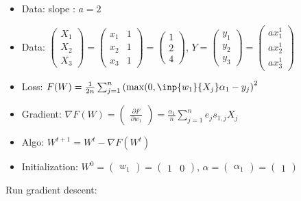 \begin{itemize}
	\item Data: slope : $a = 2$
	\item Data: $\begin{pmatrix} X_1\\X_2\\X_3\end{pmatrix} = \begin{pmatrix}x_1 & 1 \\ x_2 & 1\\x_3 & 1 \end{pmatrix}=\begin{pmatrix} 1 \\ 2 \\ 4 \end{pmatrix}  $, $Y = \begin{pmatrix}y_1\\y_2\\y_3 \end{pmatrix} = \begin{pmatrix}a x_1^1 \\ a x_2^1 \\ a x_3^1 \end{pmatrix} $
	\item Loss: $F(W) = \frac{1}{2 n} \sum_{j=1}^{n} \left(\max(0, \inp{w_1}{X_j} \alpha_1  - y_j \right)^2$
	\item Gradient: $\nabla F(W) = \begin{pmatrix} \frac{\partial F}{\partial w_1} \end{pmatrix} =
		\frac{\alpha_1}{n} \sum_{j=1}^{n} e_j s_{1, j} X_j$
	\item Algo: $W^{t+1} = W^t - \nabla F(W^t)$
	\item Initialization: $W^0 = \begin{pmatrix} w_1\end{pmatrix} = \begin{pmatrix} 1 & 0\end{pmatrix} $, $\alpha = \begin{pmatrix} \alpha_1 \end{pmatrix}=\begin{pmatrix} 1 \end{pmatrix} $
\end{itemize}

Run gradient descent:

